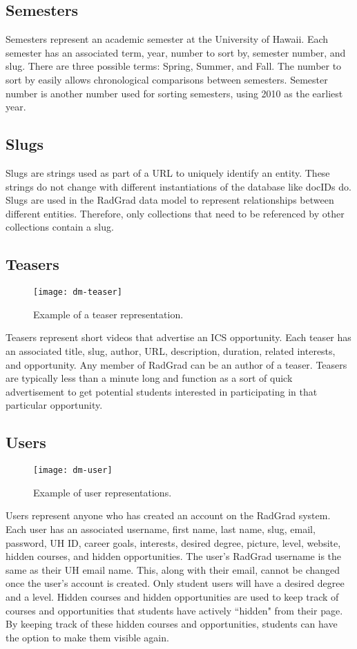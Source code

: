 \subsection{Semesters}
Semesters represent an academic semester at the University of Hawaii. Each semester has an associated term, year, number to sort by, semester number, and slug. There are three possible terms: Spring, Summer, and Fall. The number to sort by easily allows chronological comparisons between semesters. Semester number is another number used for sorting semesters, using 2010 as the earliest year. 

\subsection{Slugs}
Slugs are strings used as part of a URL to uniquely identify an entity. These strings do not change with different instantiations of the database like docIDs do. Slugs are used in the RadGrad data model to represent relationships between different entities. Therefore, only collections that need to be referenced by other collections contain a slug. 

\subsection{Teasers}
\begin{figure}[h]
\centering
\texttt{[image: dm-teaser]}
\caption{Example of a teaser representation.}
\end{figure}
Teasers represent short videos that advertise an ICS opportunity. Each teaser has an associated title, slug, author, URL, description, duration, related interests, and opportunity. Any member of RadGrad can be an author of a teaser. Teasers are typically less than a minute long and function as a sort of quick advertisement to get potential students interested in participating in that particular opportunity. 

\subsection{Users}
\begin{figure}[h]
\centering
\texttt{[image: dm-user]}
\caption{Example of user representations.}
\end{figure}
Users represent anyone who has created an account on the RadGrad system. Each user has an associated username, first name, last name, slug, email, password, UH ID, career goals, interests, desired degree, picture, level, website, hidden courses, and hidden opportunities. The user's RadGrad username is the same as their UH email name. This, along with their email, cannot be changed once the user's account is created. Only student users will have a desired degree and a level. Hidden courses and hidden opportunities are used to keep track of courses and opportunities that students have actively ``hidden" from their page. By keeping track of these hidden courses and opportunities, students can have the option to make them visible again.

